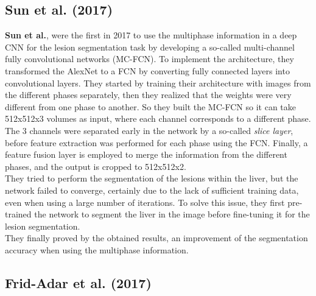 \subsection{Sun et al. (2017)}\label{sun-et-al.-2017}

\textbf{Sun et al.}, were the first in 2017 to use the multiphase
information in a deep CNN for the lesion segmentation task by developing
a so-called multi-channel fully convolutional networks (MC-FCN). To
implement the architecture, they transformed the AlexNet to a FCN by
converting fully connected layers into convolutional layers. They
started by training their architecture with images from the different
phases separately, then they realized that the weights were very
different from one phase to another. So they built the MC-FCN so it can
take 512x512x3 volumes as input, where each channel corresponds to a
different phase. The 3 channels were separated early in the network by a
so-called \emph{slice layer}, before feature extraction was performed
for each phase using the FCN. Finally, a feature fusion layer is
employed to merge the information from the different phases, and the
output is cropped to 512x512x2. \\
They tried to perform the segmentation of the lesions within the liver,
but the network failed to converge, certainly due to the lack of
sufficient training data, even when using a large number of iterations.
To solve this issue, they first pre-trained the network to segment the
liver in the image before fine-tuning it for the lesion segmentation. \\
They finally proved by the obtained results, an improvement of the
segmentation accuracy when using the multiphase information.

\subsection{Frid-Adar et al. (2017)}\label{frid-adar-et-al.-2017}

